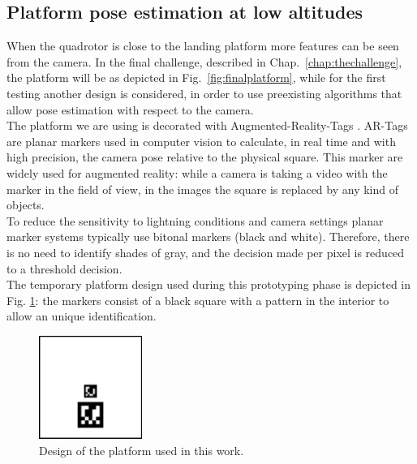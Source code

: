 \subsection{Platform pose estimation at low altitudes}
When the quadrotor is close to the landing platform more features can be seen from the camera. In the final challenge, described in Chap.~\ref{chap:thechallenge}, the platform will be as depicted in Fig.~\ref{fig:finalplatform}, while for the first testing another design is considered,  in order to use preexisting algorithms that allow pose estimation with respect to the camera.\\ 
The platform we are using is decorated with Augmented-Reality-Tags \cite{ARTAG}. AR-Tags are planar markers used in computer vision to calculate, in real time and with high precision, the camera pose relative to the physical square. This marker are widely used for augmented reality: while a camera is taking a video with the marker in the field of view, in the images the square is replaced by any kind of objects.\\
To reduce the sensitivity to lightning conditions and camera settings planar marker systems typically use bitonal markers (black and white). Therefore, there is no need to identify shades of gray, and the decision made per pixel is reduced to a threshold decision.\\
The temporary platform design used during this prototyping phase is depicted in Fig. \ref{fig:tempplatform}: the markers consist of a black square with a pattern in the interior to allow an unique identification.
\begin{figure}[!htbp]
    \centering
    \includegraphics[width=0.3\textwidth]{img/tempbase.png}
    \caption{Design of the platform used in this work.}
    \label{fig:tempplatform}
\end{figure}

